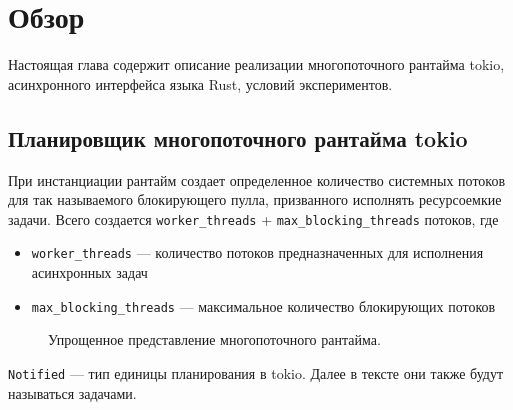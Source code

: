 
\section{Обзор}

Настоящая глава содержит описание реализации многопоточного рантайма tokio, асинхронного интерфейса языка Rust, условий экспериментов.

\subsection{Планировщик многопоточного рантайма tokio}

При инстанциации рантайм создает определенное количество системных потоков для так называемого блокирующего пулла, призванного исполнять ресурсоемкие задачи. Всего создается \verb|worker_threads| + \verb|max_blocking_threads| потоков, где

\begin{itemize}
    \item \verb|worker_threads| --- количество потоков предназначенных для исполнения асинхронных задач
    \item \verb|max_blocking_threads| --- максимальное количество блокирующих потоков
\end{itemize}

\begin{figure}[H]
    \begin{center}
    \end{center}

    \caption{Упрощенное представление многопоточного рантайма.}
    \label{fig:tokio:arch}
\end{figure}

\verb|Notified| --- тип единицы планирования в tokio. Далее в тексте они также будут называться задачами.


